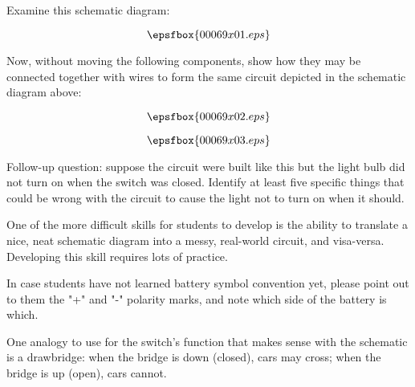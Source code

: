 

Examine this schematic diagram:

$$\epsfbox{00069x01.eps}$$

Now, without moving the following components, show how they may be connected together with wires to form the same circuit depicted in the schematic diagram above:

$$\epsfbox{00069x02.eps}$$







$$\epsfbox{00069x03.eps}$$

\vskip 10pt

Follow-up question: suppose the circuit were built like this but the light bulb did not turn on when the switch was closed.  Identify at least five specific things that could be wrong with the circuit to cause the light not to turn on when it should.







One of the more difficult skills for students to develop is the ability to translate a nice, neat schematic diagram into a messy, real-world circuit, and visa-versa.  Developing this skill requires lots of practice.

In case students have not learned battery symbol convention yet, please point out to them the "+" and "-" polarity marks, and note which side of the battery is which.

One analogy to use for the switch's function that makes sense with the schematic is a drawbridge: when the bridge is down (closed), cars may cross; when the bridge is up (open), cars cannot.




